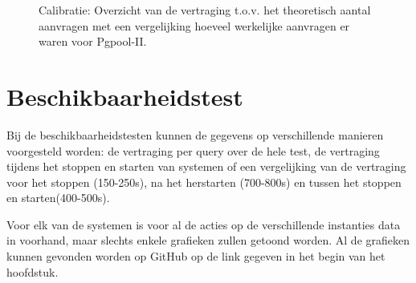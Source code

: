 \begin{figure}[htb!] 
	\centering
	\caption{Calibratie: Overzicht van de vertraging t.o.v. het theoretisch aantal aanvragen met een vergelijking hoeveel werkelijke aanvragen er waren voor Pgpool-II. }
	\label{fig:calibratie-queriesperseconde-pgpool-ii}
\end{figure}

\section{Beschikbaarheidstest}
Bij de beschikbaarheidstesten kunnen de gegevens op verschillende manieren voorgesteld worden: de vertraging per query over de hele test, de vertraging tijdens het stoppen en starten van systemen of een vergelijking van de vertraging voor het stoppen (150-250s), na het herstarten (700-800s) en tussen het stoppen en starten(400-500s). 

Voor elk van de systemen is voor al de acties op de verschillende instanties data in voorhand, maar slechts enkele grafieken zullen getoond worden. Al de grafieken kunnen gevonden worden op GitHub op de link gegeven in het begin van het hoofdstuk. 

